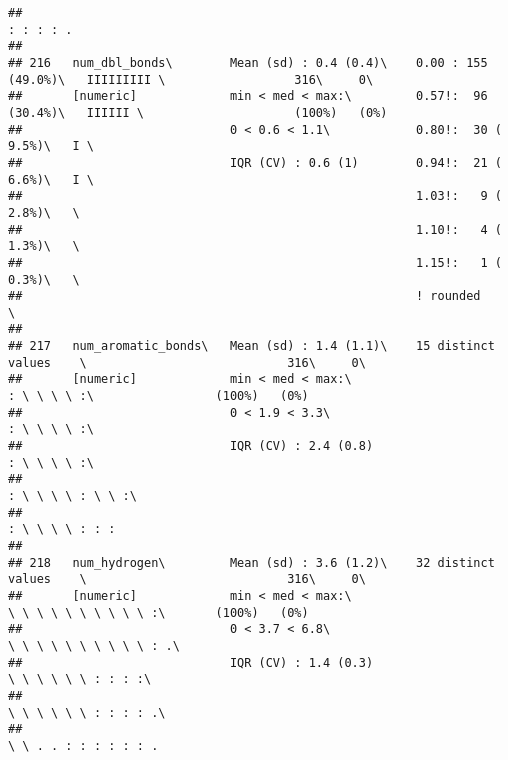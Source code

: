 \documentclass[]{article}
\begin{document}
\begin{verbatim}
##                                                                             : : : : .                                      
## 
## 216   num_dbl_bonds\        Mean (sd) : 0.4 (0.4)\    0.00 : 155 (49.0%)\   IIIIIIIII \                  316\     0\       
##       [numeric]             min < med < max:\         0.57!:  96 (30.4%)\   IIIIII \                     (100%)   (0%)     
##                             0 < 0.6 < 1.1\            0.80!:  30 ( 9.5%)\   I \                                            
##                             IQR (CV) : 0.6 (1)        0.94!:  21 ( 6.6%)\   I \                                            
##                                                       1.03!:   9 ( 2.8%)\   \                                              
##                                                       1.10!:   4 ( 1.3%)\   \                                              
##                                                       1.15!:   1 ( 0.3%)\   \                                              
##                                                       ! rounded             \                                              
## 
## 217   num_aromatic_bonds\   Mean (sd) : 1.4 (1.1)\    15 distinct values    \                            316\     0\       
##       [numeric]             min < med < max:\                               : \ \ \ \ :\                 (100%)   (0%)     
##                             0 < 1.9 < 3.3\                                  : \ \ \ \ :\                                   
##                             IQR (CV) : 2.4 (0.8)                            : \ \ \ \ :\                                   
##                                                                             : \ \ \ \ : \ \ :\                             
##                                                                             : \ \ \ \ : : :                                
## 
## 218   num_hydrogen\         Mean (sd) : 3.6 (1.2)\    32 distinct values    \                            316\     0\       
##       [numeric]             min < med < max:\                               \ \ \ \ \ \ \ \ \ \ :\       (100%)   (0%)     
##                             0 < 3.7 < 6.8\                                  \ \ \ \ \ \ \ \ \ \ : .\                       
##                             IQR (CV) : 1.4 (0.3)                            \ \ \ \ \ \ : : : :\                           
##                                                                             \ \ \ \ \ \ : : : : .\                         
##                                                                             \ \ . . : : : : : : .                          

\end{verbatim}
\end{document}
